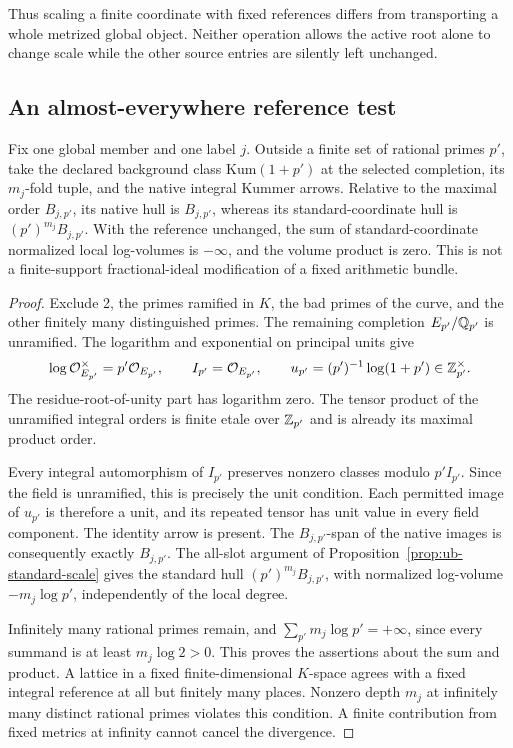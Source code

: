 Thus scaling a finite coordinate with fixed references differs
from transporting a whole metrized global object. Neither
operation allows the active root alone to change scale while
the other source entries are silently left unchanged.

\subsection{An almost-everywhere reference test}

\begin{proposition}\label{prop:ub-ae-reference}
Fix one global member and one label $j$. Outside a finite set of
rational primes $p'$, take the declared background class
$\mathrm{Kum}(1+p')$ at the selected completion, its $m_j$-fold tuple,
and the native integral Kummer arrows. Relative to the maximal
order $B_{j,p'}$, its native hull is $B_{j,p'}$, whereas its
standard-coordinate hull is $(p')^{m_j}B_{j,p'}$.
With the reference unchanged, the sum of standard-coordinate
normalized local log-volumes is $-\infty$, and the volume product
is zero. This is not a finite-support fractional-ideal modification
of a fixed arithmetic bundle.
\end{proposition}

\begin{proof}
Exclude 2, the primes ramified in $K$, the bad primes of the curve,
and the other finitely many distinguished primes. The remaining
completion $E_{p'}/\mathbb Q_{p'}$ is unramified. The logarithm and
exponential on principal units give
\[
 \log\mathcal O_{E_{p'}}^\times=p'\mathcal O_{E_{p'}},\qquad
 I_{p'}=\mathcal O_{E_{p'}},\qquad
 u_{p'}=(p')^{-1}\log(1+p')\in\mathbb Z_{p'}^\times.
\]
The residue-root-of-unity part has logarithm zero. The tensor
product of the unramified integral orders is finite etale over
$\mathbb Z_{p'}$ and is already its maximal product order.

Every integral automorphism of $I_{p'}$ preserves nonzero classes
modulo $p'I_{p'}$. Since the field is unramified, this is precisely
the unit condition. Each permitted image of $u_{p'}$ is therefore
a unit, and its repeated tensor has unit value in every field
component. The identity arrow is present. The $B_{j,p'}$-span of
the native images is consequently exactly $B_{j,p'}$.
The all-slot argument of Proposition~\ref{prop:ub-standard-scale}
gives the standard hull $(p')^{m_j}B_{j,p'}$, with normalized
log-volume $-m_j\log p'$, independently of the local degree.

Infinitely many rational primes remain, and
$\sum_{p'}m_j\log p'=+\infty$, since every summand is at least
$m_j\log2>0$. This proves the assertions about the sum and product.
A lattice in a fixed finite-dimensional $K$-space agrees with a
fixed integral reference at all but finitely many places. Nonzero
depth $m_j$ at infinitely many distinct rational primes violates
this condition. A finite contribution from fixed metrics at infinity
cannot cancel the divergence.
\end{proof}

